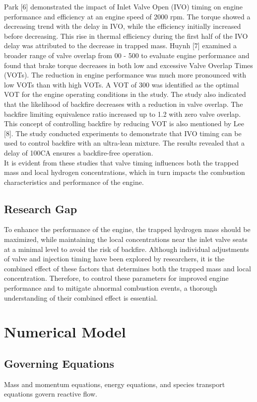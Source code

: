 \documentclass[conference]{IEEEtran}
\begin{document}
Park [6] demonstrated the impact of Inlet Valve Open (IVO) timing on engine performance and efficiency at an engine speed of 2000 rpm. The torque showed a decreasing trend with the delay in IVO, while the efficiency initially increased before decreasing. This rise in thermal efficiency during the first half of the IVO delay was attributed to the decrease in trapped mass. Huynh [7] examined a broader range of valve overlap from 00 - 500 to evaluate engine performance and found that brake torque decreases in both low and excessive Valve Overlap Times (VOTs). The reduction in engine performance was much more pronounced with low VOTs than with high VOTs. A VOT of 300 was identified as the optimal VOT for the engine operating conditions in the study. The study also indicated that the likelihood of backfire decreases with a reduction in valve overlap. The backfire limiting equivalence ratio increased up to 1.2 with zero valve overlap. This concept of controlling backfire by reducing VOT is also mentioned by Lee [8]. The study conducted experiments to demonstrate that IVO timing can be used to control backfire with an ultra-lean mixture. The results revealed that a delay of 100CA ensures a backfire-free operation.\\

It is evident from these studies that valve timing influences both the trapped mass and local hydrogen concentrations, which in turn impacts the combustion characteristics and performance of the engine.
\subsection{Research Gap}

To enhance the performance of the engine, the trapped hydrogen mass should be maximized, while maintaining the local concentrations near the inlet valve seats at a minimal level to avoid the risk of backfire. Although individual adjustments of valve and injection timing have been explored by researchers, it is the combined effect of these factors that determines both the trapped mass and local concentration. Therefore, to control these parameters for improved engine performance and to mitigate abnormal combustion events, a thorough understanding of their combined effect is essential.
\section{Numerical Model}
\subsection{Governing Equations}
Mass and momentum equations, energy equations, and species transport equations govern reactive flow.
\end{document}
